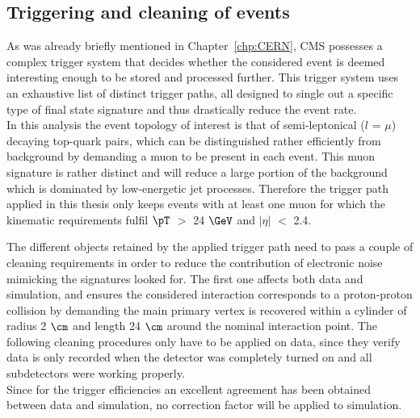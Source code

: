 \subsection{Triggering and cleaning of events}\label{subsec::Trigger}
As was already briefly mentioned in Chapter~\ref{chp:CERN}, CMS possesses a complex trigger system that decides whether the considered event is deemed interesting enough to be stored and processed further.
This trigger system uses an exhaustive list of distinct trigger paths, all designed to single out a specific type of final state signature and thus drastically reduce the event rate.
\\

In this analysis the event topology of interest is that of semi-leptonical ($l$ = $\mu$) decaying top-quark pairs, which can be distinguished rather efficiently from background by demanding a muon to be present in each event. This muon signature is rather distinct and will reduce a large portion of the background which is dominated by low-energetic jet processes.
Therefore the trigger path applied in this thesis only keeps events with at least one muon for which the kinematic requirements fulfil $\pT$ $>$ 24 $\GeV$ and $\vert \eta \vert$ $<$ 2.4.

The different objects retained by the applied trigger path need to pass a couple of cleaning requirements in order to reduce the contribution of electronic noise mimicking the signatures looked for.
The first one affects both data and simulation, and ensures the considered interaction corresponds to a proton-proton collision by demanding the main primary vertex is recovered within a cylinder of radius 2 $\cm$ and length 24 $\cm$ around the nominal interaction point.
The following cleaning procedures only have to be applied on data, since they verify data is only recorded when the detector was completely turned on and all subdetectors were working properly.
\\

Since for the trigger efficiencies an excellent agreement has been obtained between data and simulation, no correction factor will be applied to simulation.%

